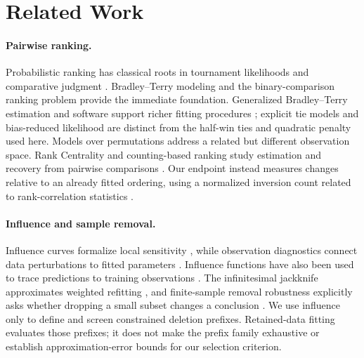 \documentclass{article}
\begin{document}
\section{Related Work}
\paragraph{Pairwise ranking.}
Probabilistic ranking has classical roots in tournament likelihoods and comparative judgment \citep{Zermelo1929,Thurstone1927}. Bradley--Terry modeling \citep{Bradley1952} and the binary-comparison ranking problem \citep{Ford1957} provide the immediate foundation. Generalized Bradley--Terry estimation and software support richer fitting procedures \citep{Hunter2004,Turner2012}; explicit tie models \citep{Davidson1970} and bias-reduced likelihood \citep{Firth1993} are distinct from the half-win ties and quadratic penalty used here. Models over permutations \citep{Plackett1975} address a related but different observation space. Rank Centrality and counting-based ranking study estimation and recovery from pairwise comparisons \citep{Negahban2012,Shah2017}. Our endpoint instead measures changes relative to an already fitted ordering, using a normalized inversion count related to rank-correlation statistics \citep{Kendall1938}.

\paragraph{Influence and sample removal.}
Influence curves formalize local sensitivity \citep{Hampel1974}, while observation diagnostics connect data perturbations to fitted parameters \citep{Cook1977}. Influence functions have also been used to trace predictions to training observations \citep{Koh2017}. The infinitesimal jackknife approximates weighted refitting \citep{Giordano2019}, and finite-sample removal robustness explicitly asks whether dropping a small subset changes a conclusion \citep{Broderick2020}. We use influence only to define and screen constrained deletion prefixes. Retained-data fitting evaluates those prefixes; it does not make the prefix family exhaustive or establish approximation-error bounds for our selection criterion.
\end{document}

